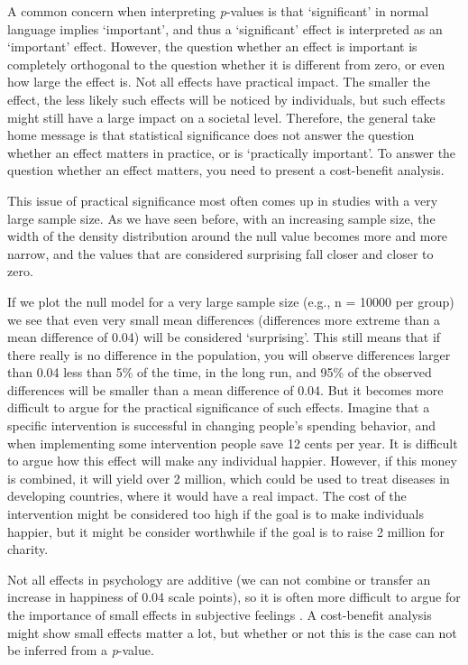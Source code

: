 \documentclass[
  oneside]{book}
\begin{document}
A common concern when interpreting \emph{p}-values is that `significant' in normal language implies `important', and thus a `significant' effect is interpreted as an `important' effect. However, the question whether an effect is important is completely orthogonal to the question whether it is different from zero, or even how large the effect is. Not all effects have practical impact. The smaller the effect, the less likely such effects will be noticed by individuals, but such effects might still have a large impact on a societal level. Therefore, the general take home message is that statistical significance does not answer the question whether an effect matters in practice, or is `practically important'. To answer the question whether an effect matters, you need to present a cost-benefit analysis.

This issue of practical significance most often comes up in studies with a very large sample size. As we have seen before, with an increasing sample size, the width of the density distribution around the null value becomes more and more narrow, and the values that are considered surprising fall closer and closer to zero.

If we plot the null model for a very large sample size (e.g., n = 10000 per group) we see that even very small mean differences (differences more extreme than a mean difference of 0.04) will be considered `surprising'. This still means that if there really is no difference in the population, you will observe differences larger than 0.04 less than 5\% of the time, in the long run, and 95\% of the observed differences will be smaller than a mean difference of 0.04. But it becomes more difficult to argue for the practical significance of such effects. Imagine that a specific intervention is successful in changing people's spending behavior, and when implementing some intervention people save 12 cents per year. It is difficult to argue how this effect will make any individual happier. However, if this money is combined, it will yield over 2 million, which could be used to treat diseases in developing countries, where it would have a real impact. The cost of the intervention might be considered too high if the goal is to make individuals happier, but it might be consider worthwhile if the goal is to raise 2 million for charity.

Not all effects in psychology are additive (we can not combine or transfer an increase in happiness of 0.04 scale points), so it is often more difficult to argue for the importance of small effects in subjective feelings \citep{anvari_not_2021}. A cost-benefit analysis might show small effects matter a lot, but whether or not this is the case can not be inferred from a \emph{p}-value.
\end{document}
